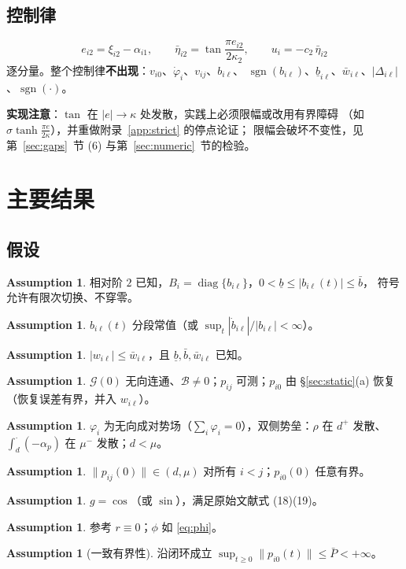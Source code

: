 \documentclass[11pt,a4paper]{article}
\newcommand{\ub}{\underline{b}}
\newcommand{\sgn}{\operatorname{sgn}}
\newcommand{\diag}{\operatorname{diag}}
\theoremstyle{plain}
\theoremstyle{definition}
\newtheorem{assumption}[theorem]{Assumption}
\theoremstyle{remark}
\begin{document}
\subsection{控制律}
\begin{equation}
\boxed{\ e_{i2}=\xi_{i2}-\alpha_{i1},\qquad
\bar\eta_{i2}=\tan\frac{\pi e_{i2}}{2\kappa_2},\qquad
u_i=-c_2\,\bar\eta_{i2}\ }
\label{eq:u}\tag{2.5}
\end{equation}
逐分量。整个控制律\textbf{不出现}：$v_{i0}$、$\dot\varphi_i$、$v_{ij}$、$b_{i\ell}$、
$\sgn(b_{i\ell})$、$\ub_{i\ell}$、$\bar w_{i\ell}$、$|\Delta_{i\ell}|$、$\sgn(\cdot)$。

\noindent\textbf{实现注意}：$\tan$ 在 $|e|\to\kappa$ 处发散，实践上必须限幅或改用有界障碍
（如 $\sigma\tanh\frac{\pi e}{2\kappa}$），并重做附录~\ref{app:strict} 的停点论证；
限幅会破坏不变性，见第~\ref{sec:gaps}~节 (6) 与第~\ref{sec:numeric}~节的检验。

\section{主要结果}
\subsection{假设}
\begin{assumption}\label{as:b}
相对阶 $2$ 已知，$B_i=\diag\{b_{i\ell}\}$，$0<\ub\le|b_{i\ell}(t)|\le\bar b$，
符号允许有限次切换、不穿零。
\end{assumption}
\begin{assumption}\label{as:pw}
$b_{i\ell}(t)$ 分段常值（或 $\sup_t|\dot b_{i\ell}|/|b_{i\ell}|<\infty$）。
\end{assumption}
\begin{assumption}\label{as:w}
$|w_{i\ell}|\le\bar w_{i\ell}$，且 $\ub,\bar b,\bar w_{i\ell}$ 已知。
\end{assumption}
\begin{assumption}\label{as:graph}
$\mathcal G(0)$ 无向连通、$\mathcal B\neq0$；$p_{ij}$ 可测；$p_{i0}$ 由
§\ref{sec:static}(a) 恢复（恢复误差有界，并入 $w_{i\ell}$）。
\end{assumption}
\begin{assumption}\label{as:pot}
$\varphi_i$ 为无向成对势场（$\sum_i\varphi_i=0$），双侧势垒：$\rho$ 在 $d^+$ 发散、
$\int_d^{\cdot}(-\alpha_p)$ 在 $\mu^-$ 发散；$d<\mu$。
\end{assumption}
\begin{assumption}\label{as:init}
$\|p_{ij}(0)\|\in(d,\mu)$ 对所有 $i<j$；$p_{i0}(0)$ 任意有界。
\end{assumption}
\begin{assumption}\label{as:g}
$g=\cos$（或 $\sin$），满足原始文献式 (18)(19)。
\end{assumption}
\begin{assumption}\label{as:phi}
参考 $r\equiv0$；$\phi$ 如 \eqref{eq:phi}。
\end{assumption}
\begin{assumption}[一致有界性]\label{as:A9}
沿闭环成立 $\sup_{t\ge0}\|p_{i0}(t)\|\le\bar P<+\infty$。
\end{assumption}
\end{document}
